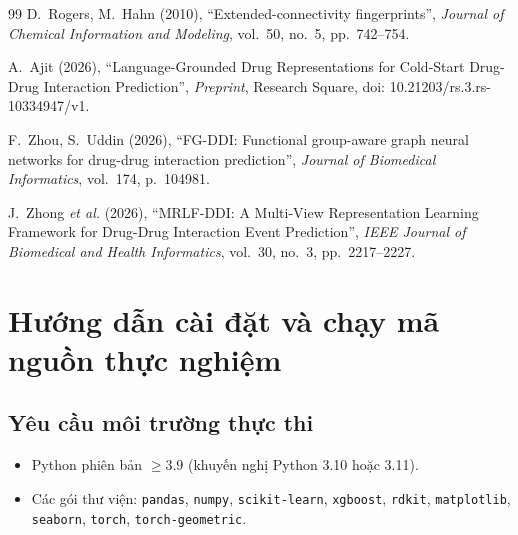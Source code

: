 \documentclass[12pt,a4paper,oneside]{report}
\newcommand{\bmchapname}{Chương}
\renewcommand{\appendixname}{Phụ lục}%
\newcommand{\tocchapname}{Chương}
\begin{document}
\begin{thebibliography}{99}
D.~Rogers, M.~Hahn (2010), ``Extended-connectivity fingerprints'', \textit{Journal of Chemical Information and Modeling}, vol.~50, no.~5, pp.~742--754.

A.~Ajit (2026), ``Language-Grounded Drug Representations for Cold-Start Drug-Drug Interaction Prediction'', \textit{Preprint}, Research Square, doi: 10.21203/rs.3.rs-10334947/v1.

F.~Zhou, S.~Uddin (2026), ``FG-DDI: Functional group-aware graph neural networks for drug-drug interaction prediction'', \textit{Journal of Biomedical Informatics}, vol.~174, p.~104981.

J.~Zhong \textit{et al.} (2026), ``MRLF-DDI: A Multi-View Representation Learning Framework for Drug-Drug Interaction Event Prediction'', \textit{IEEE Journal of Biomedical and Health Informatics}, vol.~30, no.~3, pp.~2217--2227.

\end{thebibliography}

\appendix
\renewcommand{\bmchapname}{Phụ lục}
\addtocontents{toc}{\protect\renewcommand{\protect\tocchapname}{\appendixname}}

\chapter{Hướng dẫn cài đặt và chạy mã nguồn thực nghiệm}
\label{pl:huongdan}

\section{Yêu cầu môi trường thực thi}
\begin{itemize}
  \item Python phiên bản $\ge 3.9$ (khuyến nghị Python 3.10 hoặc 3.11).
  \item Các gói thư viện: \texttt{pandas}, \texttt{numpy}, \texttt{scikit-learn}, \texttt{xgboost}, \texttt{rdkit}, \texttt{matplotlib}, \texttt{seaborn}, \texttt{torch}, \texttt{torch-geometric}.
\end{itemize}
\end{document}
